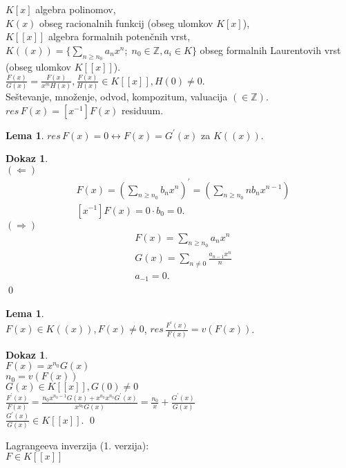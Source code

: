 \documentclass[a4paper, 12pt]{book}
\theoremstyle{definition}
\newtheorem{lemma}[counter]{Lema}
\newtheorem{pro}[counter]{Dokaz}
\theoremstyle{remark}
\newcommand{\Z}{\mathbb{Z}}
\begin{document}
$K[x]$ algebra polinomov, \\
$K(x)$ obseg racionalnih funkcij (obseg ulomkov $K[x]$), \\
$K[[x]]$ algebra formalnih potenčnih vrst, \\
$K((x)) = \{\sum_{n \geq n_0} a_n x^n; \; n_0 \in \Z, a_i \in K\}$ obseg formalnih Laurentovih vrst (obseg ulomkov $K[[x]]$). \\
$\frac{F(x)}{G(x)} = \frac{F(x)}{x^m H(x)}, \frac{F(x)}{H(x)} \in K[[x]], H(0) \neq 0$. \\
Seštevanje, množenje, odvod, kompozitum, valuacija $(\in \Z)$. \\
$res \, F(x) = [x^{-1}] F(x)$ residuum.
\begin{lemma}
  $res \, F(x) = 0 \leftrightarrow F(x) = G^{'}(x)$ za $K((x))$.
\end{lemma}
\begin{pro} \text{} \\
  $(\Longleftarrow)$
  \begin{align*}
    &F(x) = \left(\sum_{n \geq n_0} b_n x^n \right)^{'} = \left(\sum_{n \geq n_0} n b_n x^{n-1} \right) \\
    &[x^{-1}] F(x) = 0 \cdot b_0 = 0.
  \end{align*}
  $(\Longrightarrow)$
  \begin{align*}
    &F(x) = \sum_{n \geq n_0} a_n x^n \\
    &G(x) = \sum_{n \neq 0} \frac{a_{n-1} x^n}{n} \\
    &a_{-1} = 0.
  \end{align*}
  \qed
\end{pro}
\begin{lemma} \text{} \\
  $F(x) \in K((x)), F(x) \neq 0$,
  $res \, \frac{F^{'}(x)}{F(x)} = v(F(x))$.
\end{lemma}
\begin{pro} \text{} \\
  $F(x) = x^{n_0} G(x)$ \\
  $n_0 = v(F(x))$ \\
  $G(x) \in K[[x]], G(0) \neq 0$ \\
  $\frac{F^{'}(x)}{F(x)} = \frac{n_0 x^{n_0 - 1} G(x) + x^{n_0} x^{n_0} G^{'}(x)}{x^{n_0} G(x)} = \frac{n_0}{x} + \frac{G^{'}(x)}{G(x)}$ \\
  $\frac{G^{'}(x)}{G(x)} \in K[[x]]$.
  \qed
\end{pro}
Lagrangeeva inverzija (1. verzija): \\
$F \in K[[x]]$ \\
\end{document}
